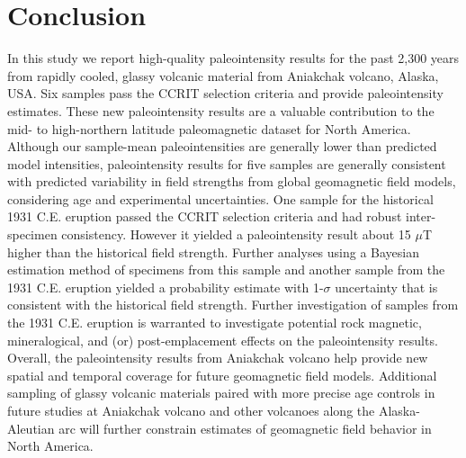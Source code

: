 \documentclass[draft]{agujournal2019}
\begin{document}
\section{Conclusion}
In this study we report high-quality paleointensity results for the past 2,300 years from rapidly cooled, glassy volcanic material from Aniakchak volcano, Alaska, USA. Six samples pass the CCRIT selection criteria and provide paleointensity estimates. These new paleointensity results are a valuable contribution to the mid- to high-northern latitude paleomagnetic dataset for North America. Although our sample-mean paleointensities are generally lower than predicted model intensities, paleointensity results for five samples are generally consistent with predicted variability in field strengths from global geomagnetic field models, considering age and experimental uncertainties. One sample for the historical 1931 C.E. eruption passed the CCRIT selection criteria and had robust inter-specimen consistency. However it yielded a paleointensity result about 15 $\mu$T higher than the historical field strength. Further analyses using a Bayesian estimation method of specimens from this sample and another sample from the 1931 C.E. eruption yielded a probability estimate with 1-$\sigma$ uncertainty that is consistent with the historical field strength. Further investigation of samples from the 1931 C.E. eruption is warranted to investigate potential rock magnetic, mineralogical, and (or) post-emplacement effects on the paleointensity results. Overall, the paleointensity results from Aniakchak volcano help provide new spatial and temporal coverage for future geomagnetic field models. Additional sampling of glassy volcanic materials paired with more precise age controls in future studies at Aniakchak volcano and other volcanoes along the Alaska-Aleutian arc will further constrain estimates of geomagnetic field behavior in North America.
\end{document}
